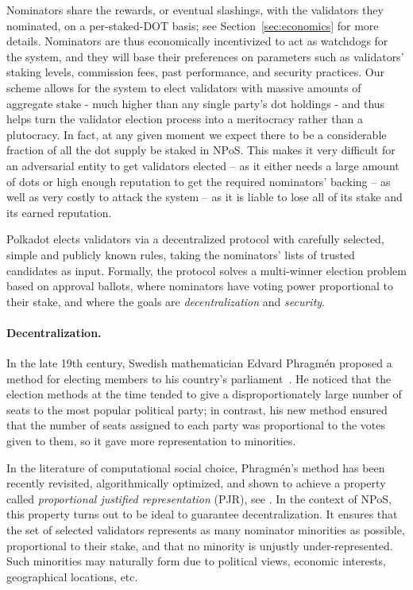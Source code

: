 Nominators share the rewards, or eventual slashings, with the validators they nominated, on a per-staked-DOT basis; 
see Section~\ref{sec:economics} for more details. 
Nominators are thus economically incentivized to act as watchdogs for the system, and they will base their preferences 
on parameters such as validators' staking levels, commission fees, past performance, and security practices.
Our scheme allows for the system to elect validators with massive amounts of aggregate stake
- much higher than any single party's dot holdings -
and thus helps turn the validator election process into a meritocracy rather than a plutocracy.
In fact, at any given moment we expect there to be a considerable fraction of all the dot supply be staked in NPoS.
This makes it very difficult for an adversarial entity to get validators elected 
-- as it either needs a large amount of dots or high enough reputation to get the required nominators' backing -- 
as well as very costly to attack the system -- as it is liable to lose all of its stake and its earned reputation.

Polkadot elects validators via a decentralized protocol with carefully selected, simple and publicly known rules,
taking the nominators' lists of trusted candidates as input. Formally, the protocol solves a multi-winner election
problem based on approval ballots, where nominators have voting power proportional to their stake,
and where the goals are \emph{decentralization} and \emph{security}.

\paragraph{Decentralization.} \label{par:decentralization} In the late 19th century, Swedish mathematician Edvard Phragm\'{e}n
proposed a method for electing members to his country’s parliament~\cite{brill2017phragmen}.
He noticed that the election methods at the time tended to give a disproportionately large number of seats 
to the most popular political party; in contrast, his new method ensured that the number of seats
assigned to each party was proportional to the votes given to them, so it gave more representation to minorities.

In the literature of computational social choice, Phragm\'{e}n's method has been recently revisited, 
algorithmically optimized, and shown to achieve a property called \emph{proportional justified representation} (PJR), 
see \cite{sanchez2017proportional, brill2017phragmen}.
In the context of NPoS, this property turns out to be ideal to guarantee decentralization.
It ensures that the set of selected validators represents as many nominator minorities as possible,
proportional to their stake, and that no minority is unjustly under-represented.
Such minorities may naturally form due to political views, economic interests, geographical locations, etc.


